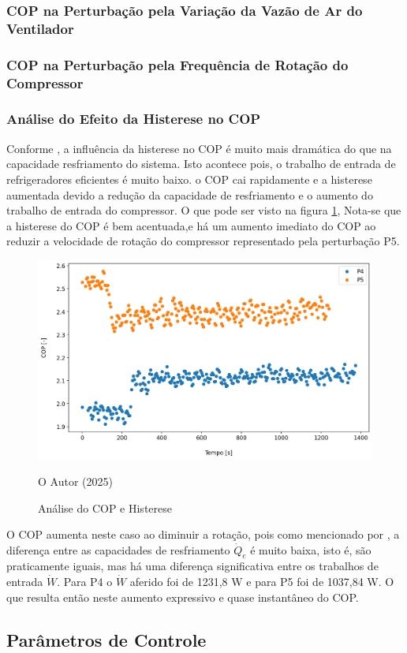 \subsubsection{COP na Perturbação pela Variação da Vazão de Ar do Ventilador}

\subsubsection{COP na Perturbação pela Frequência de Rotação do Compressor}

\subsubsection{Análise do Efeito da Histerese no COP}

Conforme \cite{MASCHE2021302}, a influência da histerese no COP é muito mais dramática do que na capacidade resfriamento do sistema. Isto acontece pois, o trabalho de entrada de refrigeradores eficientes é muito baixo. o COP cai rapidamente e a histerese aumentada devido a redução da capacidade de resfriamento e o aumento do trabalho de entrada do compressor. O que pode ser visto na figura \ref{fig:Análise do COP Histerese}, Nota-se que a histerese do COP é bem acentuada,e há um aumento imediato do COP ao reduzir a velocidade de rotação do compressor representado pela perturbação P5.

\begin{figure}[h]
    \centering
    \includegraphics[width=1\linewidth]{FigurasdoTexto/COP Histerese.png}
    \caption{Análise do COP e Histerese}
    \label{fig:Análise do COP Histerese}
    {\footnotesize O Autor (2025)}
\end{figure}

O COP aumenta neste caso ao diminuir a rotação, pois como mencionado por \textcite{MASCHE2021302}, a diferença entre as capacidades de resfriamento $\dot Q_e$ é muito baixa, isto é, são praticamente iguais, mas há uma diferença significativa entre os trabalhos de entrada $\dot W$. Para P4 o $\dot W$ aferido foi de 1231,8 W e para P5 foi de 1037,84 W. O que resulta então neste aumento expressivo e quase instantâneo do COP. 

\subsection{Parâmetros de Controle}